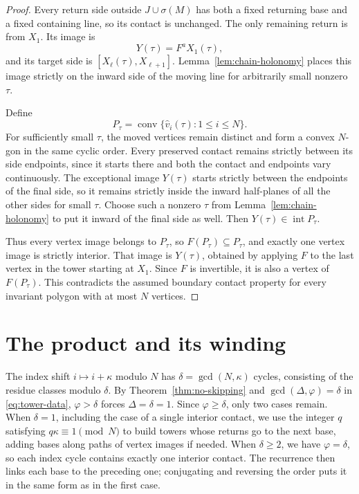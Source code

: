 \documentclass[11pt,a4paper]{article}
\theoremstyle{definition}
\theoremstyle{remark}
\numberwithin{equation}{section}
\begin{document}
\begin{proof}
Every return side outside $J\cup\sigma(M)$ has both a fixed returning base and a fixed containing line, so its contact is unchanged. The only remaining return is from $X_1$. Its image is
\[
 Y(\tau)=F^aX_1(\tau),
\]
and its target side is $[X_\ell(\tau),X_{\ell+1}]$. Lemma~\ref{lem:chain-holonomy} places this image strictly on the inward side of the moving line for arbitrarily small nonzero $\tau$.

Define
\[
 P_\tau=\operatorname{conv}\{\widehat v_i(\tau):1\le i\le N\}.
\]
For sufficiently small $\tau$, the moved vertices remain distinct and form a convex $N$-gon in the same cyclic order. Every preserved contact remains strictly between its side endpoints, since it starts there and both the contact and endpoints vary continuously. The exceptional image $Y(\tau)$ starts strictly between the endpoints of the final side, so it remains strictly inside the inward half-planes of all the other sides for small $\tau$. Choose such a nonzero $\tau$ from Lemma~\ref{lem:chain-holonomy} to put it inward of the final side as well. Then $Y(\tau)\in\operatorname{int}P_\tau$.

Thus every vertex image belongs to $P_\tau$, so $F(P_\tau)\subseteq P_\tau$, and exactly one vertex image is strictly interior. That image is $Y(\tau)$, obtained by applying $F$ to the last vertex in the tower starting at $X_1$. Since $F$ is invertible, it is also a vertex of $F(P_\tau)$. This contradicts the assumed boundary contact property for every invariant polygon with at most $N$ vertices.
\end{proof}


\section{The product and its winding}
The index shift $i\mapsto i+\kappa$ modulo $N$ has $\delta=\gcd(N,\kappa)$ cycles, consisting of the residue classes modulo $\delta$. By Theorem~\ref{thm:no-skipping} and $\gcd(\Delta,\varphi)=\delta$ in \eqref{eq:tower-data}, $\varphi>\delta$ forces $\Delta=\delta=1$. Since $\varphi\ge\delta$, only two cases remain. When $\delta=1$, including the case of a single interior contact, we use the integer $q$ satisfying $q\kappa\equiv1\pmod N$ to build towers whose returns go to the next base, adding bases along paths of vertex images if needed. When $\delta\ge2$, we have $\varphi=\delta$, so each index cycle contains exactly one interior contact. The recurrence then links each base to the preceding one; conjugating and reversing the order puts it in the same form as in the first case.
\end{document}
